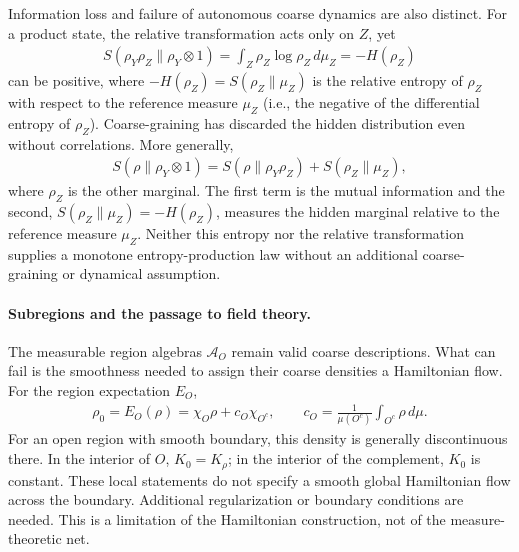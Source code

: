 \documentclass[a4paper,11pt]{article}
\theoremstyle{definition}
\theoremstyle{remark}
\newcommand{\mA}{\mathcal{A}}
\begin{document}
Information loss and failure of autonomous coarse dynamics are also distinct.  For a
product state, the relative transformation acts only on $Z$, yet
\begin{align}
    S(\rho_Y\rho_Z\|\rho_Y\otimes1)
    =\int_Z\rho_Z\log\rho_Z\,d\mu_Z = -H(\rho_Z)
\end{align}
can be positive, where $-H(\rho_Z)=S(\rho_Z\|\mu_Z)$ is the relative entropy of
$\rho_Z$ with respect to the reference measure $\mu_Z$ (i.e., the negative of the
differential entropy of $\rho_Z$).  Coarse-graining has discarded the hidden
distribution even without correlations.  More generally,
\begin{align}
    S(\rho\|\rho_Y\otimes1)
    =S(\rho\|\rho_Y\rho_Z)+S(\rho_Z\|\mu_Z),
\end{align}
where $\rho_Z$ is the other marginal.  The first term is the mutual information and the
second, $S(\rho_Z\|\mu_Z)=-H(\rho_Z)$, measures the hidden marginal relative to the
reference measure $\mu_Z$.  Neither this entropy nor the relative transformation
supplies a monotone entropy-production law without an additional coarse-graining or
dynamical assumption.
 
\paragraph{Subregions and the passage to field theory.}
The measurable region algebras $\mA_O$ remain valid coarse descriptions.  What can fail
is the smoothness needed to assign their coarse densities a Hamiltonian flow.  For the
region expectation $E_O$,
\begin{align}
    \rho_0=E_O(\rho)=\chi_O\rho+c_O\chi_{O^c},\qquad
    c_O=\frac{1}{\mu(O^c)}\int_{O^c}\rho\,d\mu.
\end{align}
For an open region with smooth boundary, this density is generally discontinuous there.
In the interior of $O$, $K_0=K_\rho$; in the interior of the complement, $K_0$ is
constant.  These local statements do not specify a smooth global Hamiltonian flow
across the boundary.  Additional regularization or boundary conditions are needed.
This is a limitation of the Hamiltonian construction, not of the measure-theoretic net.
 
\end{document}
